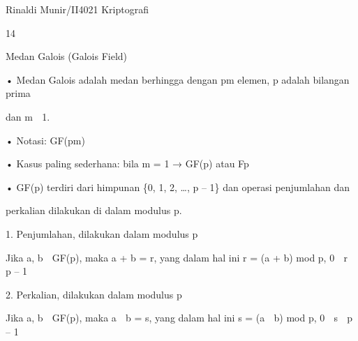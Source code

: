 \documentclass{article}
\begin{document}

Rinaldi Munir/II4021 Kriptografi

14

Medan Galois (Galois Field)

• Medan Galois adalah medan berhingga dengan pm elemen, p adalah bilangan prima 

dan m  1.

• Notasi: GF(pm)

• Kasus paling sederhana: bila m = 1 → GF(p) atau Fp 

• GF(p) terdiri dari himpunan \{0, 1, 2, …, p – 1\} dan operasi penjumlahan dan 

perkalian dilakukan di dalam modulus p. 

   1. Penjumlahan, dilakukan dalam modulus p

     Jika a, b  GF(p), maka a + b = r, yang dalam hal ini  r = (a + b) mod p,  0  r  p – 1

 2. Perkalian, dilakukan dalam modulus p

    Jika a, b  GF(p), maka a  b = s, yang dalam hal ini s = (a  b) mod p,   0  s  p – 1
\end{document}
